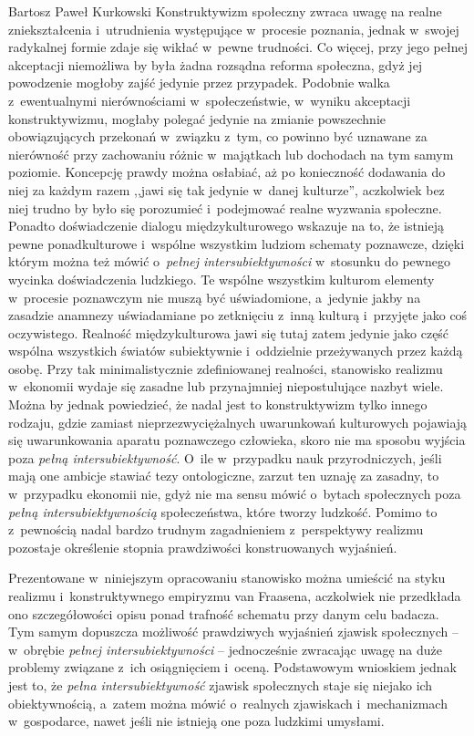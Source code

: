 \begin{artplenv}{Bartosz Paweł Kurkowski}
Konstruktywizm społeczny zwraca uwagę na realne zniekształcenia i~utrudnienia występujące w~procesie poznania,
jednak w~swojej radykalnej formie zdaje się wikłać w~pewne trudności. Co więcej, przy jego pełnej akceptacji niemożliwa by była
żadna rozsądna reforma społeczna, gdyż jej powodzenie mogłoby zajść jedynie przez przypadek. Podobnie
walka z~ewentualnymi nierównościami w~społeczeństwie, w~wyniku akceptacji konstruktywizmu, mogłaby polegać jedynie na zmianie
powszechnie obowiązujących przekonań w~związku z~tym, co powinno być uznawane za nierówność przy zachowaniu
różnic w~majątkach lub dochodach na tym samym poziomie.  Koncepcję prawdy można osłabiać, aż po konieczność dodawania do niej za
każdym razem ,,jawi się tak jedynie w~danej kulturze'', aczkolwiek bez niej trudno by było się porozumieć i~podejmować
realne wyzwania społeczne. Ponadto doświadczenie dialogu międzykulturowego wskazuje na to, że istnieją pewne
ponadkulturowe i~wspólne wszystkim ludziom schematy poznawcze, dzięki którym można też mówić o~\textit{pełnej
intersubiektywności} w~stosunku do pewnego wycinka doświadczenia ludzkiego. Te wspólne wszystkim kulturom
elementy w~procesie poznawczym nie muszą być uświadomione, a~jedynie jakby na zasadzie anamnezy uświadamiane po zetknięciu z~inną
kulturą i~przyjęte jako coś oczywistego. Realność międzykulturowa jawi się tutaj zatem jedynie jako część wspólna
wszystkich światów subiektywnie i~oddzielnie przeżywanych przez każdą osobę. Przy tak minimalistycznie zdefiniowanej
realności, stanowisko realizmu w~ekonomii wydaje się zasadne lub przynajmniej niepostulujące nazbyt wiele. Można by
jednak powiedzieć, że nadal jest to konstruktywizm tylko innego rodzaju, gdzie zamiast nieprzezwyciężalnych uwarunkowań
kulturowych pojawiają się uwarunkowania aparatu poznawczego człowieka, skoro nie ma sposobu wyjścia poza \textit{pełną
intersubiektywność}. O~ile w~przypadku nauk przyrodniczych, jeśli mają one ambicje stawiać tezy ontologiczne, zarzut
ten uznaję za zasadny, to w~przypadku ekonomii nie, gdyż nie ma sensu mówić o~bytach społecznych poza \textit{pełną
intersubiektywnością} społeczeństwa, które tworzy ludzkość. Pomimo to z~pewnością nadal bardzo trudnym
zagadnieniem z~perspektywy realizmu pozostaje określenie stopnia prawdziwości konstruowanych wyjaśnień.


Prezentowane w~niniejszym opracowaniu stanowisko można umieścić na styku realizmu i~konstruktywnego empiryzmu van
Fraasena, aczkolwiek nie przedkłada ono szczegółowości opisu ponad trafność schematu przy danym celu badacza. Tym samym
dopuszcza możliwość prawdziwych wyjaśnień zjawisk społecznych -- w~obrębie
\textit{pełnej intersubiektywności} -- jednocześnie zwracając uwagę na duże problemy
związane z~ich osiągnięciem i~oceną. Podstawowym wnioskiem jednak jest
to, że \textit{pełna intersubiektywność }zjawisk społecznych staje się niejako ich obiektywnością, a~zatem można mówić
o~realnych zjawiskach i~mechanizmach w~gospodarce, nawet jeśli nie istnieją one poza ludzkimi umysłami.


\end{artplenv}
